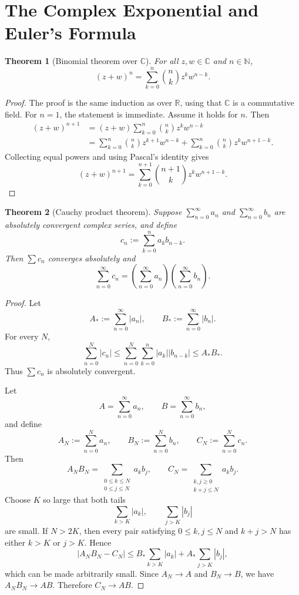 \documentclass[11pt]{article}
\newtheorem{theorem}{Theorem}[section]
\newcommand{\C}{\mathbb{C}}
\newcommand{\R}{\mathbb{R}}
\newcommand{\N}{\mathbb{N}}
\newcommand{\abs}[1]{\left|#1\right|}
\begin{document}
\section{The Complex Exponential and Euler's Formula}

\begin{theorem}[Binomial theorem over $\C$]
For all $z,w\in\C$ and $n\in\N$,
\[
  (z+w)^{n}=\sum_{k=0}^{n}\binom{n}{k}z^{k}w^{n-k}.
\]
\end{theorem}

\begin{proof}
The proof is the same induction as over $\R$, using that $\C$ is a commutative field.
For $n=1$, the statement is immediate.
Assume it holds for $n$.
Then
\[
\begin{aligned}
  (z+w)^{n+1}
    &= (z+w)\sum_{k=0}^{n}\binom{n}{k}z^{k}w^{n-k} \\
    &= \sum_{k=0}^{n}\binom{n}{k}z^{k+1}w^{n-k}
       +\sum_{k=0}^{n}\binom{n}{k}z^{k}w^{n+1-k}.
\end{aligned}
\]
Collecting equal powers and using Pascal's identity gives
\[
  (z+w)^{n+1}
  =\sum_{k=0}^{n+1}\binom{n+1}{k}z^{k}w^{n+1-k}.
\]
\end{proof}

\begin{theorem}[Cauchy product theorem]
Suppose $\sum_{n=0}^{\infty}a_{n}$ and $\sum_{n=0}^{\infty}b_{n}$ are absolutely convergent complex series, and define
\[
  c_{n}:=\sum_{k=0}^{n}a_{k}b_{n-k}.
\]
Then $\sum c_{n}$ converges absolutely and
\[
  \sum_{n=0}^{\infty}c_{n}
  =
  \left(\sum_{n=0}^{\infty}a_{n}\right)
  \left(\sum_{n=0}^{\infty}b_{n}\right).
\]
\end{theorem}

\begin{proof}
Let
\[
  A_{*}:=\sum_{n=0}^{\infty}\abs{a_{n}},
  \qquad
  B_{*}:=\sum_{n=0}^{\infty}\abs{b_{n}}.
\]
For every $N$,
\[
  \sum_{n=0}^{N}\abs{c_{n}}
  \le
  \sum_{n=0}^{N}\sum_{k=0}^{n}\abs{a_{k}}\abs{b_{n-k}}
  \le A_{*}B_{*}.
\]
Thus $\sum c_{n}$ is absolutely convergent.

Let
\[
  A=\sum_{n=0}^{\infty}a_{n},
  \qquad
  B=\sum_{n=0}^{\infty}b_{n},
\]
and define
\[
  A_{N}:=\sum_{n=0}^{N}a_{n},
  \qquad
  B_{N}:=\sum_{n=0}^{N}b_{n},
  \qquad
  C_{N}:=\sum_{n=0}^{N}c_{n}.
\]
Then
\[
  A_{N}B_{N}
  =
  \sum_{\substack{0\le k\le N\\0\le j\le N}}a_{k}b_{j},
  \qquad
  C_{N}
  =
  \sum_{\substack{k,j\ge0\\k+j\le N}}a_{k}b_{j}.
\]
Choose $K$ so large that both tails
\[
  \sum_{k>K}\abs{a_{k}},
  \qquad
  \sum_{j>K}\abs{b_{j}}
\]
are small. If $N>2K$, then every pair satisfying $0\le k,j\le N$ and $k+j>N$ has either $k>K$ or $j>K$.
Hence
\[
  \abs{A_{N}B_{N}-C_{N}}
  \le
  B_{*}\sum_{k>K}\abs{a_{k}}
  +
  A_{*}\sum_{j>K}\abs{b_{j}},
\]
which can be made arbitrarily small.
Since $A_{N}\to A$ and $B_{N}\to B$, we have $A_{N}B_{N}\to AB$.
Therefore $C_{N}\to AB$.
\end{proof}
\end{document}
